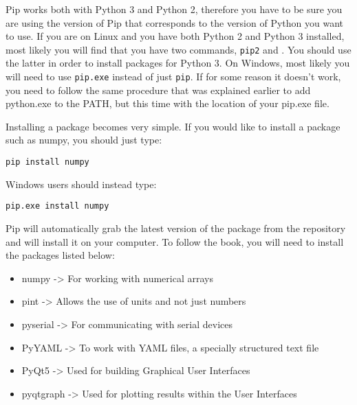 Pip works both with Python 3 and Python 2, therefore you have to be sure you are using the version of Pip that corresponds to the version of Python you want to use. If you are on Linux and you have both Python 2 and Python 3 installed, most likely you will find that you have two commands, \texttt{pip2} and . You should use the latter in order to install packages for Python 3. On Windows, most likely you will need to use \texttt{pip.exe} instead of just \texttt{pip}. If for some reason it doesn't work, you need to follow the same procedure that was explained earlier to add python.exe to the PATH, but this time with the location of your pip.exe file.



Installing a package becomes very simple. If you would like to install a package such as numpy, you should just type:
\begin{verbatim}
pip install numpy
\end{verbatim}

Windows users should instead type:
\begin{verbatim}
pip.exe install numpy
\end{verbatim}


Pip will automatically grab the latest version of the package from the repository and will install it on your computer. To follow the book, you will need to install the packages listed below:
\begin{itemize}
 \item numpy -> For working with numerical arrays
 \item pint -> Allows the use of units and not just numbers
 \item pyserial -> For communicating with serial devices
 \item PyYAML -> To work with YAML files, a specially structured text file
 \item PyQt5 -> Used for building Graphical User Interfaces
 \item pyqtgraph -> Used for plotting results within the User Interfaces
\end{itemize}

